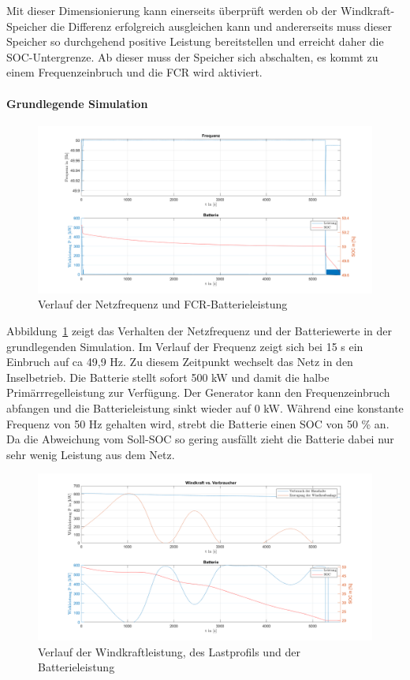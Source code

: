Mit dieser Dimensionierung kann einerseits überprüft werden ob der Windkraft-Speicher die Differenz erfolgreich ausgleichen kann
und andererseits muss dieser Speicher so durchgehend positive Leistung bereitstellen und erreicht daher die SOC-Untergrenze.
Ab dieser muss der Speicher sich abschalten, es kommt zu einem Frequenzeinbruch und die FCR wird aktiviert.

\paragraph{Grundlegende Simulation}

\begin{figure}[h!]
	\centering
	\includegraphics[width=14cm]{Abbildungen/FreqBat2.png}
	\caption{Verlauf der Netzfrequenz und FCR-Batterieleistung}\label{Verlauf1}
\end{figure}

Abbildung~\ref{Verlauf1} zeigt das Verhalten der Netzfrequenz und der Batteriewerte in der grundlegenden Simulation.
Im Verlauf der Frequenz zeigt sich bei 15 s ein Einbruch auf ca 49,9 Hz. 
Zu diesem Zeitpunkt wechselt das Netz in den Inselbetrieb.
Die Batterie stellt sofort 500 kW und damit die halbe Primärrregelleistung zur Verfügung.
Der Generator kann den Frequenzeinbruch abfangen und die Batterieleistung sinkt wieder auf 0 kW.
Während eine konstante Frequenz von 50 Hz gehalten wird, strebt die Batterie einen SOC von 50 \% an.
Da die Abweichung vom Soll-SOC so gering ausfällt zieht die Batterie dabei nur sehr wenig Leistung aus dem Netz.

\begin{figure}[h!]
	\centering
	\includegraphics[width=14cm]{Abbildungen/VerbrBat.png}
	\caption{Verlauf der Windkraftleistung, des Lastprofils und der Batterieleistung}\label{Verlauf2}
\end{figure}

